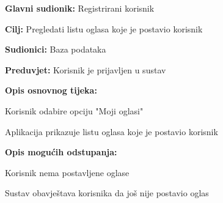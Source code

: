\noindent {}
\begin{packed_item}
	
	\item \textbf{Glavni sudionik: }Registrirani korisnik
	\item  \textbf{Cilj:} Pregledati listu oglasa koje je postavio korisnik
	\item  \textbf{Sudionici:} Baza podataka
	\item  \textbf{Preduvjet:} Korisnik je prijavljen u sustav
	\item  \textbf{Opis osnovnog tijeka:}
	
	\item[] \begin{packed_enum}
		
		\item Korisnik odabire opciju "Moji oglasi"
		\item Aplikacija prikazuje listu oglasa koje je postavio korisnik

	\end{packed_enum}
	
	\item  \textbf{Opis mogućih odstupanja:}
	
	\item[] \begin{packed_item}
		
		\item[2.a] Korisnik nema postavljene oglase
		\item[] \begin{packed_enum}
			
			\item Sustav obavještava korisnika da još nije postavio oglas
			
		\end{packed_enum}
		
		
	\end{packed_item}
\end{packed_item}

